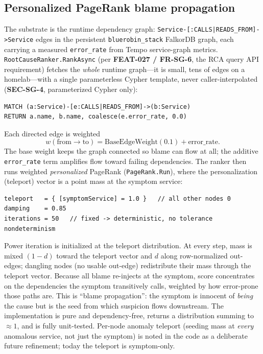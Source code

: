 \documentclass[11pt]{article}
\begin{document}
\subsection{Personalized PageRank blame propagation}

The substrate is the runtime dependency graph:
\texttt{Service-[:CALLS|READS\_FROM]->Service} edges in the persistent
\texttt{bluerobin\_stack} FalkorDB graph, each carrying a measured
\texttt{error\_rate} from Tempo service-graph metrics.
\texttt{RootCauseRanker.RankAsync} (per \textbf{FEAT-027 / FR-SG-6}, the RCA query
API requirement) fetches the \emph{whole} runtime graph---it is small, tens of
edges on a homelab---with a single parameterless Cypher template, never
caller-interpolated (\textbf{SEC-SG-4}, parameterized Cypher only):

\begin{verbatim}
MATCH (a:Service)-[e:CALLS|READS_FROM]->(b:Service)
RETURN a.name, b.name, coalesce(e.error_rate, 0.0)
\end{verbatim}

Each directed edge is weighted
\begin{equation}
w(\text{from} \to \text{to}) = \text{BaseEdgeWeight}(0.1) + \text{error\_rate}.
\end{equation}
The base weight keeps the graph connected so blame can flow at all; the additive
\texttt{error\_rate} term amplifies flow toward failing dependencies. The ranker
then runs weighted \emph{personalized} PageRank (\texttt{PageRank.Run}), where the
personalization (teleport) vector is a point mass at the symptom service:

\begin{verbatim}
teleport   = { [symptomService] = 1.0 }   // all other nodes 0
damping    = 0.85
iterations = 50   // fixed -> deterministic, no tolerance nondeterminism
\end{verbatim}

Power iteration is initialized at the teleport distribution. At every step, mass
is mixed $(1-d)$ toward the teleport vector and $d$ along row-normalized
out-edges; dangling nodes (no usable out-edge) redistribute their mass through the
teleport vector. Because all blame re-injects at the symptom, score concentrates
on the dependencies the symptom transitively calls, weighted by how error-prone
those paths are. This is ``blame propagation'': the symptom is innocent of
\emph{being} the cause but is the seed from which suspicion flows downstream. The
implementation is pure and dependency-free, returns a distribution summing to
$\approx 1$, and is fully unit-tested. Per-node anomaly teleport (seeding mass at
\emph{every} anomalous service, not just the symptom) is noted in the code as a
deliberate future refinement; today the teleport is symptom-only.
\end{document}
